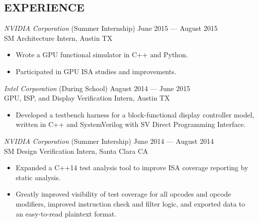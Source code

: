 \documentclass[margin]{res}
\begin{document}
\begin{resume}
  \section{EXPERIENCE}
  {\sl NVIDIA Corporation}
  \hfill (Summer Internship) June 2015 --- August 2015 \\
  SM Architecture Intern, Austin TX
  \vspace{0.25em}
  \begin{itemize}
  \item Wrote a GPU functional simulator in C++ and Python.
  \item Participated in GPU ISA studies and improvements.
  \end{itemize}
  \vspace{-.5em}
  {\sl Intel Corporation}
  \hfill (During School) August 2014 --- June 2015 \\
  GPU, ISP, and Display Verification Intern, Austin TX
  \vspace{0.25em}
  \begin{itemize}
  \item Developed a testbench harness for a block-functional display controller
    model, written in C++ and SystemVerilog with SV Direct Programming
    Interface.
  \end{itemize}
  \vspace{-.5em}
  {\sl NVIDIA Corporation}
  \hfill (Summer Intership) June 2014 --- August 2014 \\
  SM Design Verification Intern, Santa Clara CA
  \vspace{0.25em}
  \begin{itemize}
  \item Expanded a C++14 test analysis tool to improve ISA coverage reporting
    by static analysis.
  \item Greatly improved visibility of test coverage for all opcodes and opcode
    modifiers, improved instruction check and filter logic, and exported data to
    an easy-to-read plaintext format.
  \end{itemize}

\end{resume}
\end{document}
